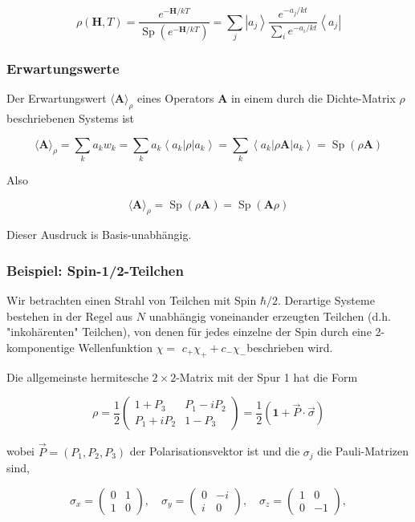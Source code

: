 \documentclass[10pt, letterpaper]{article}
\begin{document}
$$
\rho(\mathbf{H}, T)=\frac{e^{-\mathbf{H} / k T}}{\operatorname{Sp}\left(e^{-\mathbf{H} / k T}\right)}=\sum_{j}\left|a_{j}\right\rangle \frac{e^{-a_{j} / k t}}{\sum_{i} e^{-a_{i} / k t}}\left\langle a_{j}\right|
$$

\subsubsection*{Erwartungswerte}
Der Erwartungswert $\langle\mathbf{A}\rangle_{\rho}$ eines Operators $\mathbf{A}$ in einem durch die Dichte-Matrix $\rho$ beschriebenen Systems ist

$$
\langle\mathbf{A}\rangle_{\rho}=\sum_{k} a_{k} w_{k}=\sum_{k} a_{k}\left\langle a_{k}\right| \rho\left|a_{k}\right\rangle=\sum_{k}\left\langle a_{k}\right| \rho \mathbf{A}\left|a_{k}\right\rangle=\operatorname{Sp}(\rho \mathbf{A})
$$

Also

$$
\langle\mathbf{A}\rangle_{\rho}=\operatorname{Sp}(\rho \mathbf{A})=\operatorname{Sp}(\mathbf{A} \rho)
$$

Dieser Ausdruck is Basis-unabhängig.

\subsubsection*{Beispiel: Spin-1/2-Teilchen}
Wir betrachten einen Strahl von Teilchen mit Spin $\hbar / 2$. Derartige Systeme bestehen in der Regel aus $N$ unabhängig voneinander erzeugten Teilchen (d.h. "inkohärenten" Teilchen), von denen für jedes einzelne der Spin durch eine 2-komponentige Wellenfunktion $\chi=$ $c_{+} \chi_{+}+c_{-} \chi_{-}$beschrieben wird.

Die allgemeinste hermitesche $2 \times 2$-Matrix mit der Spur 1 hat die Form

$$
\rho=\frac{1}{2}\left(\begin{array}{cc}
1+P_{3} & P_{1}-i P_{2} \\
P_{1}+i P_{2} & 1-P_{3}
\end{array}\right)=\frac{1}{2}(\mathbf{1}+\vec{P} \cdot \vec{\sigma})
$$

wobei $\vec{P}=\left(P_{1}, P_{2}, P_{3}\right)$ der Polarisationsvektor ist und die $\sigma_{j}$ die Pauli-Matrizen sind,

$$
\sigma_{x}=\left(\begin{array}{cc}
0 & 1 \\
1 & 0
\end{array}\right), \quad \sigma_{y}=\left(\begin{array}{cc}
0 & -i \\
i & 0
\end{array}\right), \quad \sigma_{z}=\left(\begin{array}{cc}
1 & 0 \\
0 & -1
\end{array}\right),
$$
\end{document}
